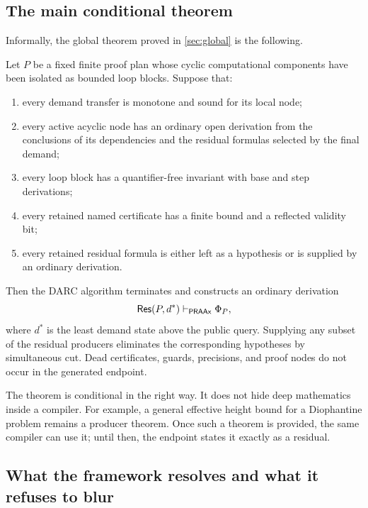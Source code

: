 \subsection{The main conditional theorem}

Informally, the global theorem proved in \cref{sec:global} is the following.

\begin{theorem}
Let \(P\) be a fixed finite proof plan whose cyclic computational components
have been isolated as bounded loop blocks.  Suppose that:
\begin{enumerate}
  \item every demand transfer is monotone and sound for its local node;
  \item every active acyclic node has an ordinary open derivation from the
        conclusions of its dependencies and the residual formulas selected by
        the final demand;
  \item every loop block has a quantifier-free invariant with base and step
        derivations;
  \item every retained named certificate has a finite bound and a reflected
        validity bit;
  \item every retained residual formula is either left as a hypothesis or is
        supplied by an ordinary derivation.
\end{enumerate}
Then the DARC algorithm terminates and constructs an ordinary derivation
\[
  \mathsf{Res}(P,d^*)\vdash_{\mathsf{PRAAx}}\Phi_P,
\]
where \(d^*\) is the least demand state above the public query.  Supplying any
subset of the residual producers eliminates the corresponding hypotheses by
simultaneous cut.  Dead certificates, guards, precisions, and proof nodes do
not occur in the generated endpoint.
\end{theorem}

The theorem is conditional in the right way.  It does not hide deep mathematics
inside a compiler.  For example, a general effective height bound for a
Diophantine problem remains a producer theorem.  Once such a theorem is
provided, the same compiler can use it; until then, the endpoint states it
exactly as a residual.

\subsection{What the framework resolves and what it refuses to blur}

